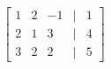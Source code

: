 \documentclass[preview]{standalone}
\begin{document}
\begin{align*}
\begin{bmatrix} 1 & 2 & -1 & | & 1 \\ 2 & 1 & 3 & | & 4 \\ 3 & 2 & 2 & | & 5 \end{bmatrix}
\end{align*}
\end{document}
